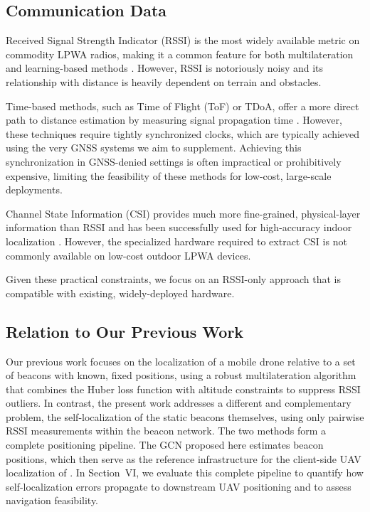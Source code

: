 \documentclass{ieeeaccess}
\begin{document}
\subsection{Communication Data}
Received Signal Strength Indicator (RSSI) is the most widely available metric on commodity LPWA radios, making it a common feature for both multilateration and learning-based methods \cite{r2}. However, RSSI is notoriously noisy and its relationship with distance is heavily dependent on terrain and obstacles.

Time-based methods, such as Time of Flight (ToF) or TDoA, offer a more direct path to distance estimation by measuring signal propagation time \cite{r12,r13}. However, these techniques require tightly synchronized clocks, which are typically achieved using the very GNSS systems we aim to supplement. Achieving this synchronization in GNSS-denied settings is often impractical or prohibitively expensive, limiting the feasibility of these methods for low-cost, large-scale deployments.

Channel State Information (CSI) provides much more fine-grained, physical-layer information than RSSI and has been successfully used for high-accuracy indoor localization \cite{r8}. However, the specialized hardware required to extract CSI is not commonly available on low-cost outdoor LPWA devices.

Given these practical constraints, we focus on an RSSI-only approach that is compatible with existing, widely-deployed hardware.

\subsection{Relation to Our Previous Work}
Our previous work \cite{r1} focuses on the localization of a mobile drone relative to a set of beacons with known, fixed positions, using a robust multilateration algorithm that combines the Huber loss function with altitude constraints to suppress RSSI outliers. In contrast, the present work addresses a different and complementary problem, the self-localization of the static beacons themselves, using only pairwise RSSI measurements within the beacon network. The two methods form a complete positioning pipeline. The GCN proposed here estimates beacon positions, which then serve as the reference infrastructure for the client-side UAV localization of \cite{r1}. In Section~VI, we evaluate this complete pipeline to quantify how self-localization errors propagate to downstream UAV positioning and to assess navigation feasibility.
\end{document}
